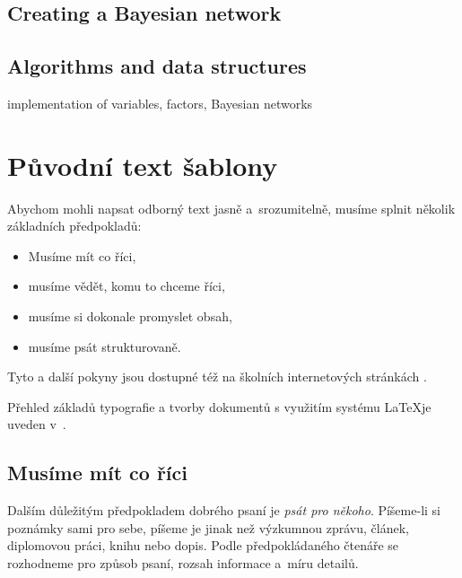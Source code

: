 \documentclass[english,cover]{fitthesis} %
\newcommand{\todo}[1]{{\color{red} #1}}
\begin{document}
\section{Creating a Bayesian network}















\section{Algorithms and data structures}

\todo{implementation of variables, factors, Bayesian networks}























\chapter{Původní text šablony}
Abychom mohli napsat odborný text jasně a~srozumitelně, musíme splnit několik základních předpokladů:
\begin{itemize}
\item Musíme mít co říci,
\item musíme vědět, komu to chceme říci,
\item musíme si dokonale promyslet obsah,
\item musíme psát strukturovaně. 
\end{itemize}

Tyto a další pokyny jsou dostupné též na školních internetových stránkách \cite{fitWeb}.

Přehled základů typografie a tvorby dokumentů s využitím systému \LaTeX je 
uveden v~\cite{Rybicka}.

\section{Musíme mít co říci}
Dalším důležitým předpokladem dobrého psaní je {\it psát pro někoho}. Píšeme-li si poznámky sami pro sebe, píšeme je jinak než výzkumnou zprávu, článek, diplomovou práci, knihu nebo dopis. Podle předpokládaného čtenáře se rozhodneme pro způsob psaní, rozsah informace a~míru detailů.
\end{document}
